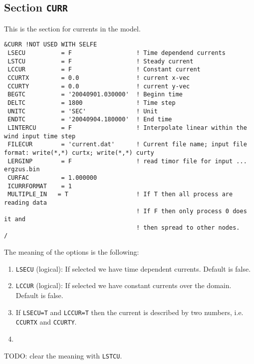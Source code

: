 \documentclass[12pt]{amsart}
\begin{document}
\subsection{Section {\tt CURR}}
This is the section for currents in the model.

\begin{verbatim}
&CURR !NOT USED WITH SELFE
 LSECU          = F                  ! Time dependend currents
 LSTCU          = F                  ! Steady current
 LCCUR          = F                  ! Constant current
 CCURTX         = 0.0                ! current x-vec
 CCURTY         = 0.0                ! current y-vec
 BEGTC          = '20040901.030000'  ! Beginn time
 DELTC          = 1800               ! Time step
 UNITC          = 'SEC'              ! Unit
 ENDTC          = '20040904.180000'  ! End time
 LINTERCU       = F                  ! Interpolate linear within the wind input time step
 FILECUR        = 'current.dat'      ! Current file name; input file format: write(*,*) curtx; write(*,*) curty
 LERGINP        = F                  ! read timor file for input ... ergzus.bin
 CURFAC         = 1.000000
 ICURRFORMAT    = 1
 MULTIPLE_IN   = T                   ! If T then all process are reading data
                                     ! If F then only process 0 does it and
                                     ! then spread to other nodes.
/
\end{verbatim}
The meaning of the options is the following:
\begin{enumerate}
\item {\tt LSECU} (logical): If selected we have time dependent currents. Default is false.
\item {\tt LCCUR} (logical): If selected we have constant currents over the domain. Default is false.
\item If {\tt LSECU=T} and {\tt LCCUR=T} then the current is described by two numbers, i.e. {\tt CCURTX} and {\tt CCURTY}.
\item 
\end{enumerate}
TODO: clear the meaning with {\tt LSTCU}.
\end{document}
